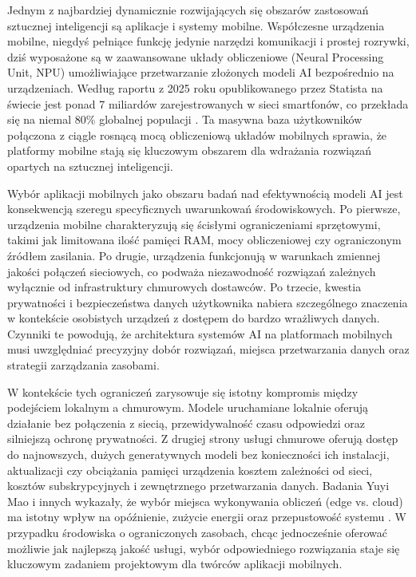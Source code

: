 Jednym z najbardziej dynamicznie rozwijających się obszarów zastosowań sztucznej inteligencji
są aplikacje i systemy mobilne. Współczesne urządzenia mobilne, niegdyś pełniące funkcję jedynie
narzędzi komunikacji i prostej rozrywki, dziś wyposażone są w zaawansowane układy obliczeniowe
(Neural Processing Unit, NPU) umożliwiające przetwarzanie złożonych modeli AI bezpośrednio na urządzeniach. Według raportu z 2025 roku opublikowanego przez Statista na świecie jest ponad 7 miliardów
zarejestrowanych w sieci smartfonów, co przekłada się na niemal 80\% globalnej populacji \cite{smartphone_users_2025}.
Ta masywna baza użytkowników połączona z ciągle rosnącą mocą obliczeniową układów mobilnych sprawia,
że platformy mobilne stają się kluczowym obszarem dla wdrażania rozwiązań opartych na sztucznej inteligencji.


Wybór aplikacji mobilnych jako obszaru badań nad efektywnością modeli AI jest konsekwencją szeregu specyficznych uwarunkowań środowiskowych.
Po pierwsze, urządzenia mobilne charakteryzują się ścisłymi ograniczeniami sprzętowymi, takimi jak limitowana ilość pamięci RAM, mocy obliczeniowej
czy ograniczonym źródłem zasilania. Po drugie, urządzenia funkcjonują w warunkach zmiennej jakości połączeń sieciowych, co podważa niezawodność rozwiązań 
zależnych wyłącznie od infrastruktury chmurowych dostawców. Po trzecie, kwestia prywatności i bezpieczeństwa danych użytkownika nabiera szczególnego 
znaczenia w kontekście osobistych urządzeń z dostępem do bardzo wrażliwych danych. Czynniki te powodują, że architektura systemów AI na platformach mobilnych
musi uwzględniać precyzyjny dobór rozwiązań, miejsca przetwarzania danych oraz strategii zarządzania zasobami.

W kontekście tych ograniczeń zarysowuje się istotny kompromis między podejściem lokalnym a chmurowym.
Modele uruchamiane lokalnie oferują działanie bez połączenia z siecią,
przewidywalność czasu odpowiedzi oraz silniejszą ochronę prywatności. Z drugiej strony usługi chmurowe oferują dostęp 
do najnowszych, dużych generatywnych modeli bez konieczności ich instalacji, aktualizacji czy obciążania pamięci urządzenia
kosztem zależności od sieci, kosztów subskrypcyjnych i zewnętrznego przetwarzania danych. Badania Yuyi Mao i innych wykazały,
że wybór miejsca wykonywania obliczeń (edge vs. cloud) ma istotny wpływ na opóźnienie, zużycie energii
oraz przepustowość systemu \cite{edge_vs_cloud_mao2017}. W przypadku środowiska o ograniczonych zasobach, 
chcąc jednocześnie oferować możliwie jak najlepszą jakość usługi, wybór odpowiedniego rozwiązania staje się kluczowym zadaniem projektowym dla twórców aplikacji mobilnych.


